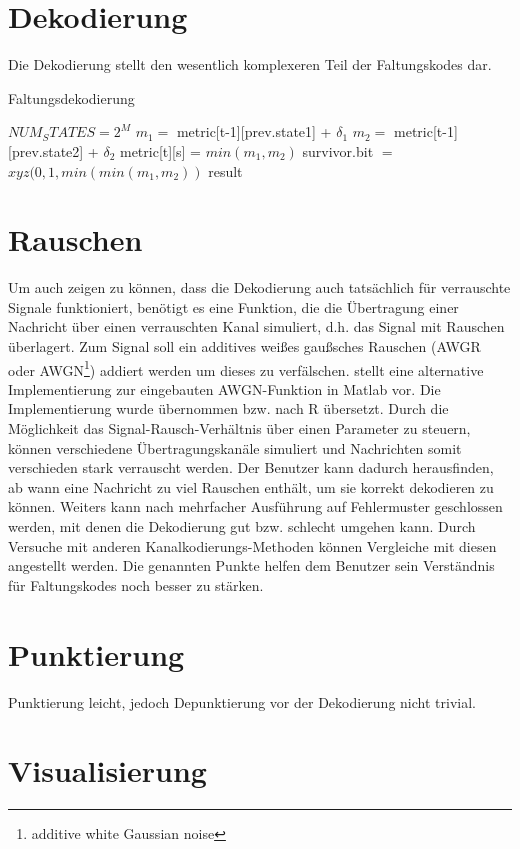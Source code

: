 \section{Dekodierung}
\label{kapitel:implementierung_dekodierung}
Die Dekodierung stellt den wesentlich komplexeren Teil der Faltungskodes dar. 

\begin{algorithm}[H]
\renewcommand{\algorithmicforall}{\textbf{for each}}
\caption{Faltungsdekodierung}
\label{algorithmus:dekodierung}
\begin{algorithmic}[1]
\STATE $NUM_STATES=2^{M}$
   	\STATE $m_{1}=$ metric[t-1][prev.state1] + $\delta_{1}$
   	\STATE $m_{2}=$ metric[t-1][prev.state2] + $\delta_{2}$
      \STATE metric[t][s] = $min(m_{1},m_{2})$
      \STATE survivor.bit $=$ $xyz(0,1,min(min(m_{1},m_{2}))$
	\ENDFOR
\ENDFOR
\RETURN result
\end{algorithmic}
\end{algorithm}

\section{Rauschen}
\label{kapitel:implementierung_noise}
Um auch zeigen zu können, dass die Dekodierung auch tatsächlich für verrauschte Signale funktioniert, benötigt es eine Funktion, die die Übertragung einer Nachricht über einen verrauschten Kanal simuliert, d.h. das Signal mit Rauschen überlagert. Zum Signal soll ein additives weißes gaußsches Rauschen (AWGR oder AWGN\footnote{additive white Gaussian noise}) addiert werden um dieses zu verfälschen. \cite{AWGN} stellt eine alternative Implementierung zur eingebauten AWGN-Funktion in Matlab vor. Die Implementierung wurde übernommen bzw. nach R übersetzt. Durch die Möglichkeit das Signal-Rausch-Verhältnis über einen Parameter zu steuern, können verschiedene Übertragungskanäle simuliert und Nachrichten somit verschieden stark verrauscht werden. Der Benutzer kann dadurch herausfinden, ab wann eine Nachricht zu viel Rauschen enthält, um sie korrekt dekodieren zu können. Weiters kann nach mehrfacher Ausführung auf Fehlermuster geschlossen werden, mit denen die Dekodierung gut bzw. schlecht umgehen kann. Durch Versuche mit anderen Kanalkodierungs-Methoden können Vergleiche mit diesen angestellt werden. Die genannten Punkte helfen dem Benutzer sein Verständnis für Faltungskodes noch besser zu stärken.

\section{Punktierung}
\label{kapitel:implementierung_punktierung}
Punktierung leicht, jedoch Depunktierung vor der Dekodierung nicht trivial.

\section{Visualisierung}
\label{kapitel:implementierung_visualisierung}